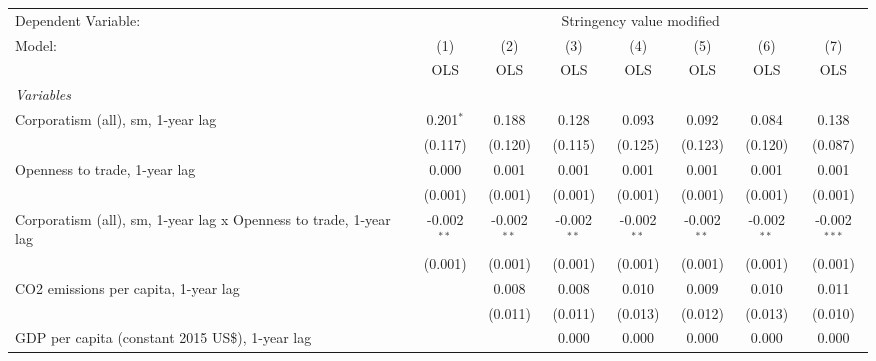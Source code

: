 
\begingroup
\centering
\begin{tabular}{lccccccc}
   \toprule
   Dependent Variable: & \multicolumn{7}{c}{Stringency value modified}\\
   Model:                                                            & (1)           & (2)           & (3)           & (4)           & (5)           & (6)           & (7)\\  
                                                                     &  OLS          & OLS           & OLS           & OLS           & OLS           & OLS           & OLS\\  
   \midrule
   \emph{Variables}\\
   Corporatism (all), sm, 1-year lag                                 & 0.201$^{*}$   & 0.188         & 0.128         & 0.093         & 0.092         & 0.084         & 0.138\\   
                                                                     & (0.117)       & (0.120)       & (0.115)       & (0.125)       & (0.123)       & (0.120)       & (0.087)\\   
   Openness to trade, 1-year lag                                     & 0.000         & 0.001         & 0.001         & 0.001         & 0.001         & 0.001         & 0.001\\   
                                                                     & (0.001)       & (0.001)       & (0.001)       & (0.001)       & (0.001)       & (0.001)       & (0.001)\\   
   Corporatism (all), sm, 1-year lag x Openness to trade, 1-year lag & -0.002$^{**}$ & -0.002$^{**}$ & -0.002$^{**}$ & -0.002$^{**}$ & -0.002$^{**}$ & -0.002$^{**}$ & -0.002$^{***}$\\   
                                                                     & (0.001)       & (0.001)       & (0.001)       & (0.001)       & (0.001)       & (0.001)       & (0.001)\\   
   CO2 emissions per capita, 1-year lag                              &               & 0.008         & 0.008         & 0.010         & 0.009         & 0.010         & 0.011\\   
                                                                     &               & (0.011)       & (0.011)       & (0.013)       & (0.012)       & (0.013)       & (0.010)\\   
   GDP per capita (constant 2015 US\$), 1-year lag                   &               &               & 0.000         & 0.000         & 0.000         & 0.000         & 0.000\\   

\end{tabular}
